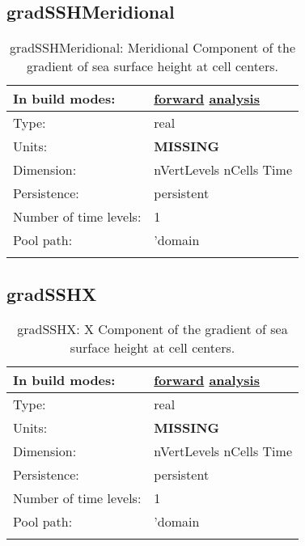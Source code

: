\subsection[gradSSHMeridional]{gradSSHMeridional}
\label{subsec:var_sec_diagnostics_gradSSHMeridional}
\begin{center}
\begin{longtable}{| p{2.0in} | p{4.0in} |}
        \hline 
        In build modes: & \hyperref[subsec:forward_var_tab_diagnostics]{forward} \hyperref[subsec:analysis_var_tab_diagnostics]{analysis} \\
        \hline 
        Type: & real \\
        \hline 
        Units: & {\bf \color{red} MISSING} \\
        \hline 
        Dimension: & nVertLevels nCells Time \\
        \hline 
        Persistence: & persistent \\
        \hline 
        Number of time levels: & 1 \\
        \hline 
            Pool path: & 'domain %
 \\
		 \hline 
    \caption{gradSSHMeridional: Meridional Component of the gradient of sea surface height at cell centers.}
\end{longtable}
\end{center}
\subsection[gradSSHX]{gradSSHX}
\label{subsec:var_sec_diagnostics_gradSSHX}
\begin{center}
\begin{longtable}{| p{2.0in} | p{4.0in} |}
        \hline 
        In build modes: & \hyperref[subsec:forward_var_tab_diagnostics]{forward} \hyperref[subsec:analysis_var_tab_diagnostics]{analysis} \\
        \hline 
        Type: & real \\
        \hline 
        Units: & {\bf \color{red} MISSING} \\
        \hline 
        Dimension: & nVertLevels nCells Time \\
        \hline 
        Persistence: & persistent \\
        \hline 
        Number of time levels: & 1 \\
        \hline 
            Pool path: & 'domain %
 \\
		 \hline 
    \caption{gradSSHX: X Component of the gradient of sea surface height at cell centers.}
\end{longtable}
\end{center}
